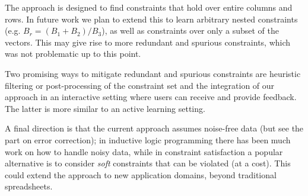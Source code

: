 \documentclass{IEEEtran}
\newcommand{\sbs}{B}
\newcommand{\sbl}[1]{\ensuremath{\sbs_{\textit{#1}}}}
\theoremstyle{definition}
\begin{document}
The approach is designed to find constraints that hold over entire columns and rows. In future work we plan to extend this to learn arbitrary nested constraints (e.g. $\sbl{r} = (\sbl{1} + \sbl{2}) / \sbl{3}$), as well as constraints over only a subset of the vectors. This may give rise to more redundant and spurious constraints, which was not problematic up to this point.

Two promising ways to mitigate redundant and spurious constraints are heuristic filtering or post-processing of the constraint set and the integration of our approach in an interactive setting where users can receive and provide feedback.
The latter is more similar to an active learning setting.

A final direction is that the current approach assumes noise-free data (but see the part on error correction); in inductive logic programming there has been much work on how to handle noisy data, while in constraint satisfaction a popular alternative is to consider \textit{soft} constraints that can be violated (at a cost). 
This could extend the approach to new application domains, beyond traditional spreadsheets.



{\footnotesize
  }
\end{document}
